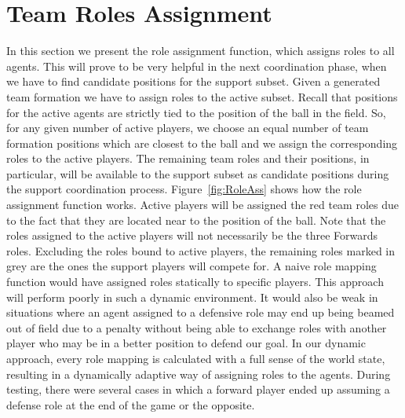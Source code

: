 \section{Team Roles Assignment}
In this section we present the role assignment function, which assigns roles to all agents. This will prove to be very helpful in the next coordination phase, when we have to find candidate positions for the support subset. Given a generated team formation we have to assign roles to the active subset. Recall that positions for the active agents are strictly tied to the position of the ball in the field. So, for any given number of active players, we choose an equal number of team formation positions which are closest to the ball and we assign the corresponding roles to the active players. The remaining team roles and their positions, in particular, will be available to the support subset as candidate positions during the support coordination process. Figure~\ref{fig:RoleAss} shows how the role assignment function works. Active players will be assigned the red team roles due to the fact that they are located near to the position of the ball. Note that the roles assigned to the active players will not necessarily be the three Forwards roles. Excluding the roles bound to active players, the remaining roles marked in grey are the ones the support players will compete for. A naive role mapping function would have assigned roles statically to specific players. This approach will perform poorly in such a dynamic environment. It would also be weak in situations where an agent assigned to a defensive role may end up being beamed out of field due to a penalty without being able to exchange roles with another player who may be in a better position to defend our goal. In our dynamic approach, every role mapping is calculated with a full sense of the world state, resulting in a dynamically adaptive way of assigning roles to the agents. During testing, there were several cases in which a forward player ended up assuming a defense role at the end of the game or the opposite.


